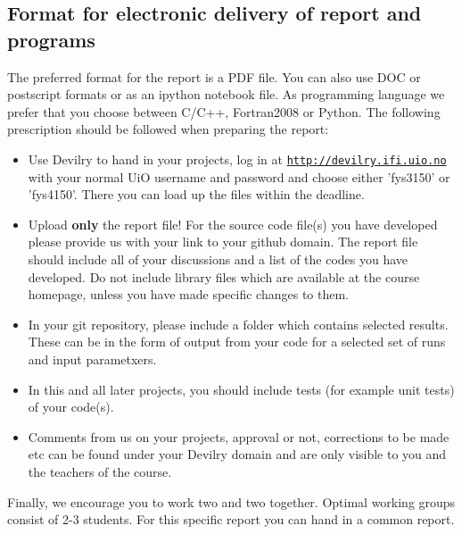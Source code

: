 \documentclass[%
oneside,                 %
final,                   %
10pt]{article}
\begin{document}
\noindent
\subsection*{Format for electronic delivery of report and programs}

The preferred format for the report is a PDF file. You can also use DOC or postscript formats or as an ipython notebook file.  As programming language we prefer that you choose between C/C++, Fortran2008 or Python. The following prescription should be followed when preparing the report:

\begin{itemize}
  \item Use Devilry to hand in your projects, log in  at  \href{{http://devilry.ifi.uio.no}}{\nolinkurl{http://devilry.ifi.uio.no}} with your normal UiO username and password and choose either 'fys3150' or 'fys4150'. There you can load up the files within the deadline.

  \item Upload \textbf{only} the report file!  For the source code file(s) you have developed please provide us with your link to your github domain.  The report file should include all of your discussions and a list of the codes you have developed.  Do not include library files which are available at the course homepage, unless you have made specific changes to them.

  \item In your git repository, please include a folder which contains selected results. These can be in the form of output from your code for a selected set of runs and input parametxers.

  \item In this and all later projects, you should include tests (for example unit tests) of your code(s).

  \item Comments  from us on your projects, approval or not, corrections to be made  etc can be found under your Devilry domain and are only visible to you and the teachers of the course.
\end{itemize}

\noindent
Finally, 
we encourage you to work two and two together. Optimal working groups consist of 
2-3 students. For this specific report you can  hand in a common report.














\end{document}
